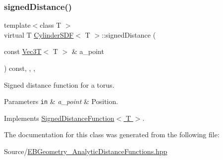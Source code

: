 \subsubsection{\texorpdfstring{signed\+Distance()}{signedDistance()}}
{\footnotesize\ttfamily template$<$class T $>$ \\
virtual T \hyperlink{classCylinderSDF}{Cylinder\+S\+DF}$<$ T $>$\+::signed\+Distance (\begin{DoxyParamCaption}\item[{const \hyperlink{classVec3T}{Vec3T}$<$ T $>$ \&}]{a\+\_\+point }\end{DoxyParamCaption}) const\hspace{0.3cm}{\ttfamily [inline]}, {\ttfamily [override]}, {\ttfamily [virtual]}, {\ttfamily [noexcept]}}



Signed distance function for a torus. 


\begin{DoxyParams}[1]{Parameters}
\mbox{\tt in}  & {\em a\+\_\+point} & Position. \\
\hline
\end{DoxyParams}


Implements \hyperlink{classSignedDistanceFunction_af5912280ca51dc21a2d6949a30ec7d21}{Signed\+Distance\+Function$<$ T $>$}.



The documentation for this class was generated from the following file\+:\begin{DoxyCompactItemize}
\item 
Source/\hyperlink{EBGeometry__AnalyticDistanceFunctions_8hpp}{E\+B\+Geometry\+\_\+\+Analytic\+Distance\+Functions.\+hpp}\end{DoxyCompactItemize}
